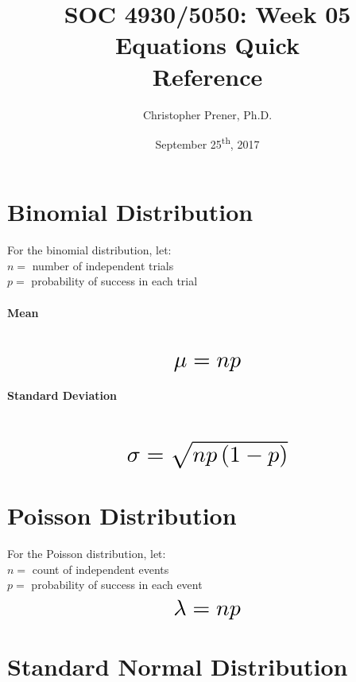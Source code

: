 \documentclass{tufte-handout}
\title{SOC 4930/5050: Week 05 Equations Quick \\Reference}
\author{Christopher Prener, Ph.D.}
\date{September 25\textsuperscript{th}, 2017}
\begin{document}
\maketitle %

\vspace{5mm}
\section{Binomial Distribution}
For the binomial distribution, let: \\
\noindent $n =$ number of independent trials \\
\noindent $p =$ probability of success in each trial

\paragraph{Mean}\mbox{}\\
\begin{equation}
\scalebox{2} {$ \mu = np $}
\end{equation}

\paragraph{Standard Deviation}\mbox{}\\
\begin{equation}
\scalebox{2} {$ \sigma =\sqrt { np\left( 1-p \right)  } $}
\end{equation}

\vspace{5mm}
\section{Poisson Distribution}
For the Poisson distribution, let: \\
\noindent $n =$ count of independent events \\
\noindent $p =$ probability of success in each event \\
\begin{equation}
\scalebox{2} {$ \lambda = np $}
\end{equation}

\vspace{5mm}
\section{Standard Normal Distribution}
\end{document}
